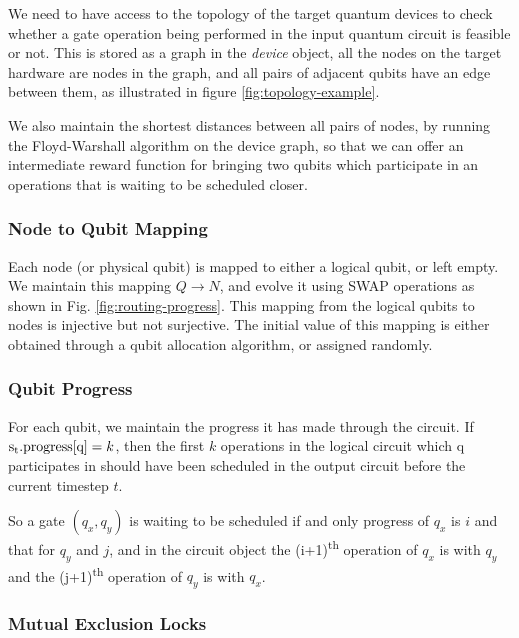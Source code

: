 \documentclass[%
 reprint,
 longbibliography,
 amsmath,amssymb,
 aps,
]{revtex4-2}
\begin{document}
We need to have access to the topology of the target quantum devices to check whether a gate operation being performed in the input quantum circuit is feasible or not. This is stored as a graph in the \textit{device} object, all the nodes on the target hardware are nodes in the graph, and all pairs of adjacent qubits have an edge between them, as illustrated in figure \ref{fig:topology-example}.

We also maintain the shortest distances between all pairs of nodes, by running the Floyd-Warshall algorithm on the device graph, so that we can offer an intermediate reward function for bringing two qubits which participate in an operations that is waiting to be scheduled closer. 

\subsubsection{\label{sec:method-state-map}Node to Qubit Mapping}

Each node (or physical qubit) is mapped to either a logical qubit, or left empty. We maintain this mapping $Q \rightarrow N$, and evolve it using SWAP operations as shown in Fig. \ref{fig:routing-progress}. 
This mapping from the logical qubits to nodes is injective but not surjective.
The initial value of this mapping is either obtained through a qubit allocation algorithm, or assigned randomly.

\subsubsection{\label{sec:method-state-progress}Qubit Progress}

For each qubit, we maintain the progress it has made through the circuit. If $\textrm{s\textsubscript{t}.progress[q]} = k$, then the first $k$ operations in the logical circuit which $\textrm{q}$ participates in should have been scheduled in the output circuit before the current timestep $t$.

\label{para:method-state-circuit-gatecond}So a gate $(q_x, q_y)$ is waiting to be scheduled if and only progress of $q_x$ is $i$ and that for $q_y$ and $j$, and in the circuit object the (i+1)\textsuperscript{th} operation of $q_x$ is with $q_y$ and the (j+1)\textsuperscript{th} operation of $q_y$ is with $q_x$.


\subsubsection{\label{sec:method-state-mutex}Mutual Exclusion Locks}
\end{document}
